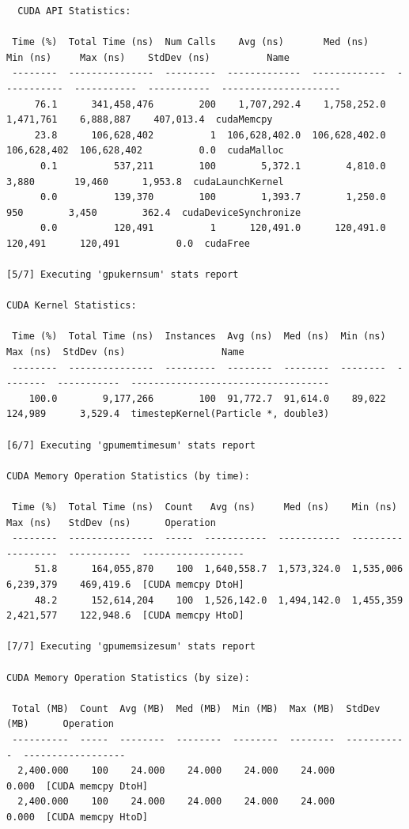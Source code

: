 \documentclass[english]{exam}
\begin{document}
\begin{lstlisting}
  CUDA API Statistics:

 Time (%)  Total Time (ns)  Num Calls    Avg (ns)       Med (ns)      Min (ns)     Max (ns)    StdDev (ns)          Name         
 --------  ---------------  ---------  -------------  -------------  -----------  -----------  -----------  ---------------------
     76.1      341,458,476        200    1,707,292.4    1,758,252.0    1,471,761    6,888,887    407,013.4  cudaMemcpy           
     23.8      106,628,402          1  106,628,402.0  106,628,402.0  106,628,402  106,628,402          0.0  cudaMalloc           
      0.1          537,211        100        5,372.1        4,810.0        3,880       19,460      1,953.8  cudaLaunchKernel     
      0.0          139,370        100        1,393.7        1,250.0          950        3,450        362.4  cudaDeviceSynchronize
      0.0          120,491          1      120,491.0      120,491.0      120,491      120,491          0.0  cudaFree             

[5/7] Executing 'gpukernsum' stats report

CUDA Kernel Statistics:

 Time (%)  Total Time (ns)  Instances  Avg (ns)  Med (ns)  Min (ns)  Max (ns)  StdDev (ns)                 Name                
 --------  ---------------  ---------  --------  --------  --------  --------  -----------  -----------------------------------
    100.0        9,177,266        100  91,772.7  91,614.0    89,022   124,989      3,529.4  timestepKernel(Particle *, double3)

[6/7] Executing 'gpumemtimesum' stats report

CUDA Memory Operation Statistics (by time):

 Time (%)  Total Time (ns)  Count   Avg (ns)     Med (ns)    Min (ns)   Max (ns)   StdDev (ns)      Operation     
 --------  ---------------  -----  -----------  -----------  ---------  ---------  -----------  ------------------
     51.8      164,055,870    100  1,640,558.7  1,573,324.0  1,535,006  6,239,379    469,419.6  [CUDA memcpy DtoH]
     48.2      152,614,204    100  1,526,142.0  1,494,142.0  1,455,359  2,421,577    122,948.6  [CUDA memcpy HtoD]

[7/7] Executing 'gpumemsizesum' stats report

CUDA Memory Operation Statistics (by size):

 Total (MB)  Count  Avg (MB)  Med (MB)  Min (MB)  Max (MB)  StdDev (MB)      Operation     
 ----------  -----  --------  --------  --------  --------  -----------  ------------------
  2,400.000    100    24.000    24.000    24.000    24.000        0.000  [CUDA memcpy DtoH]
  2,400.000    100    24.000    24.000    24.000    24.000        0.000  [CUDA memcpy HtoD]

\end{lstlisting}
\end{document}

